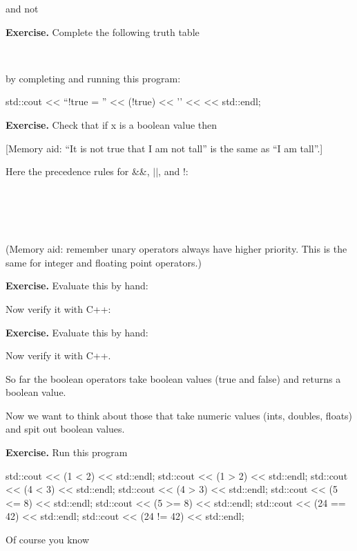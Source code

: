
and not


\textbf{Exercise.} Complete the following truth table

\\

by completing and running this program:
\begin{console}
std::cout <<  “!true = ” << (!true) << '\n'
          <<                  << std::endl;
\end{console}

\textbf{Exercise.} Check that if x is a boolean value then


[Memory aid: “It is not true that I am not tall” is the same as “I am tall”.]

Here the precedence rules for \&\&, $||$, and !:

\\
\tab[3em]{!}\\
\tab[3em]{\&\&}\\
\\

(Memory aid: remember unary operators always have higher priority.
This is the same for integer and floating point operators.)

\textbf{Exercise.} Evaluate this by hand:


Now verify it with C++:


\textbf{Exercise.} Evaluate this by hand:


Now verify it with C++.


So far the boolean operators take boolean values (true and false) and
returns a boolean value.

Now we want to think about those that take numeric values (ints,
doubles, floats) and spit out boolean values.

\textbf{Exercise.} Run this program
\begin{console}
std::cout << (1 < 2) << std::endl;
std::cout << (1 > 2) << std::endl;
std::cout << (4 < 3) << std::endl;
std::cout << (4 > 3) << std::endl;
std::cout << (5 <= 8) << std::endl;
std::cout << (5 >= 8) << std::endl;
std::cout << (24 == 42) << std::endl;
std::cout << (24 != 42) << std::endl;
\end{console}
Of course you know

